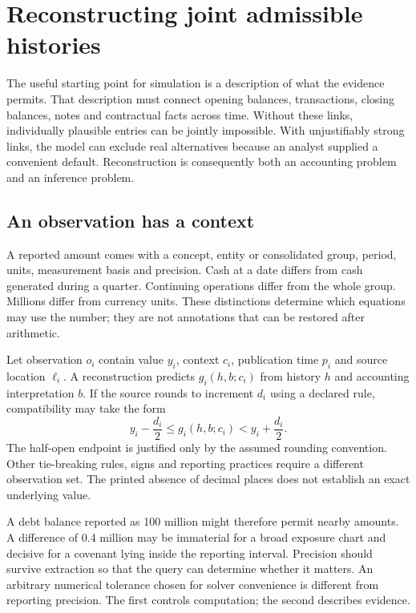 \chapter[Reconstructing joint histories]{Reconstructing joint admissible histories}
\label{sim:reconstruction}

The useful starting point for simulation is a description of what the evidence permits. That description must connect opening balances, transactions, closing balances, notes and contractual facts across time. Without these links, individually plausible entries can be jointly impossible. With unjustifiably strong links, the model can exclude real alternatives because an analyst supplied a convenient default. Reconstruction is consequently both an accounting problem and an inference problem.

\section{An observation has a context}
A reported amount comes with a concept, entity or consolidated group, period, units, measurement basis and precision. Cash at a date differs from cash generated during a quarter. Continuing operations differ from the whole group. Millions differ from currency units. These distinctions determine which equations may use the number; they are not annotations that can be restored after arithmetic.

Let observation $o_i$ contain value $y_i$, context $c_i$, publication time $p_i$ and source location $\ell_i$. A reconstruction predicts $g_i(h,b;c_i)$ from history $h$ and accounting interpretation $b$. If the source rounds to increment $d_i$ using a declared rule, compatibility may take the form
\begin{equation}
 y_i-\frac{d_i}{2}\leq g_i(h,b;c_i)<y_i+\frac{d_i}{2}.
 \label{sim:rounding}
\end{equation}
The half-open endpoint is justified only by the assumed rounding convention. Other tie-breaking rules, signs and reporting practices require a different observation set. The printed absence of decimal places does not establish an exact underlying value.

A debt balance reported as 100 million might therefore permit nearby amounts. A difference of 0.4 million may be immaterial for a broad exposure chart and decisive for a covenant lying inside the reporting interval. Precision should survive extraction so that the query can determine whether it matters. An arbitrary numerical tolerance chosen for solver convenience is different from reporting precision. The first controls computation; the second describes evidence.


